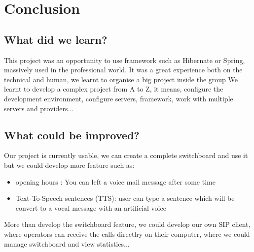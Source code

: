 \chapter{Conclusion}

\section{What did we learn?}

This project was an opportunity to use framework such as Hibernate or Spring, massively used in the professional world.
It was a great experience both on the technical and human, we learnt to organise a big project inside the group
We learnt to develop a complex project from A to Z, it means, configure the development environment, configure servers, framework, work with multiple servers and providers...

\section{What could be improved?}

Our project is currently usable, we can create a complete switchboard and use it but we could develop more feature such as:

\begin{itemize}  
\item opening hours : You can left a voice mail message after some time
\item Text-To-Speech sentences (TTS): user can type a sentence which will be convert to a vocal message with an artificial voice
\end{itemize}  

More than develop the switchboard feature, we could develop our own SIP client, where operators can receive the calls directlry on their computer, where we could manage switchboard and view statistics...

